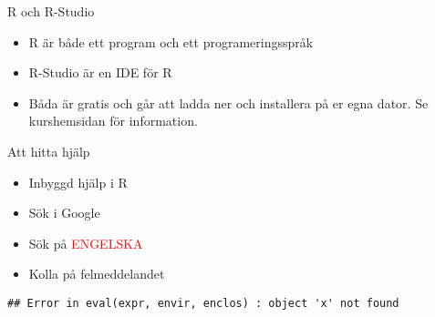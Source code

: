 \documentclass[
  10pt,
  ignorenonframetext,
]{beamer}
\providecommand{\tightlist}{%
  \setlength{\itemsep}{0pt}\setlength{\parskip}{0pt}}
\begin{document}
\begin{frame}{R och R-Studio}
\protect\hypertarget{r-och-r-studio}{}
\begin{itemize}
\tightlist
\item
  R är både ett program och ett programeringsspråk
\item
  R-Studio är en IDE för R
\item
  Båda är gratis och går att ladda ner och installera på er egna dator.
  Se kurshemsidan för information.
\end{itemize}
\end{frame}

\begin{frame}[fragile]{Att hitta hjälp}
\protect\hypertarget{att-hitta-hjuxe4lp}{}
\begin{itemize}
\tightlist
\item
  Inbyggd hjälp i R
\item
  Sök i Google
\item
  Sök på \textcolor{red}{ENGELSKA}
\item
  Kolla på felmeddelandet
\end{itemize}

\begin{verbatim}
## Error in eval(expr, envir, enclos) : object 'x' not found
\end{verbatim}
\end{frame}
\end{document}

